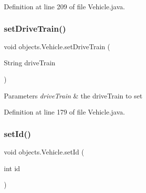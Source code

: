 Definition at line 209 of file Vehicle.\+java.


\begin{DoxyCode}{0}

\end{DoxyCode}
\mbox{\label{classobjects_1_1_vehicle_af1a360d6d0d55201647ea700649fbe8e}} 
\subsubsection{\texorpdfstring{setDriveTrain()}{setDriveTrain()}}
{\footnotesize\ttfamily void objects.\+Vehicle.\+set\+Drive\+Train (\begin{DoxyParamCaption}\item[{String}]{drive\+Train }\end{DoxyParamCaption})}


\begin{DoxyParams}{Parameters}
{\em drive\+Train} & the drive\+Train to set \\
\hline
\end{DoxyParams}


Definition at line 179 of file Vehicle.\+java.


\begin{DoxyCode}{0}

\end{DoxyCode}
\mbox{\label{classobjects_1_1_vehicle_abcf1f2331d23fd4aec0012007f630f47}} 
\subsubsection{\texorpdfstring{setId()}{setId()}}
{\footnotesize\ttfamily void objects.\+Vehicle.\+set\+Id (\begin{DoxyParamCaption}\item[{int}]{id }\end{DoxyParamCaption})}


